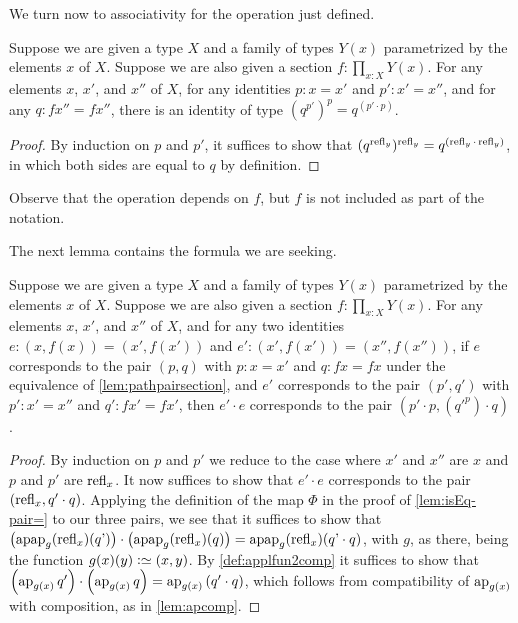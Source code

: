 We turn now to associativity for the operation just defined.

\begin{lemma}\label{def:pathsectionactionassoc}
  Suppose we are given a type $X$ and a family of types $Y(x)$ parametrized by the elements $x$ of $X$.
  Suppose we are also given a section $f : \prod_{x:X} Y(x)$.
  For any elements $x$, $x'$, and $x''$ of $X$, for any identities $p : x = x'$ and $p' : x' = x''$,
  and for any $q : f x'' = f x''$,
  there is an identity of type $ ( q ^{ p' }) ^ p = q ^{( p' \cdot p )}$.
\end{lemma}

\begin{proof}
  By induction on $p$ and $p'$, it suffices to show that $ ( q ^{ \refl y }) ^ { \refl y } = q ^{( \refl y \cdot \refl y )}$, in which both sides are
  equal to $q$ by definition.
\end{proof}

Observe that the operation depends on $f$, but $f$ is not included as part of the notation.

The next lemma contains the formula we are seeking.

\begin{lemma}\label{lem:pathpairsectionmult}
  Suppose we are given a type $X$ and a family of types $Y(x)$ parametrized by the elements $x$ of $X$.
  Suppose we are also given a section $f : \prod_{x:X} Y(x)$.
  For any elements $x$, $x'$, and $x''$ of $X$, and for any two identities $e : (x,f(x)) = (x',f(x'))$ and $e' : (x',f(x')) = (x'',f(x''))$,
  if $e$ corresponds to the pair $(p,q)$ with $p : x = x'$ and $q : f x = f x$ under the equivalence of \cref{lem:pathpairsection},
  and $e'$ corresponds to the pair $(p',q')$ with $p' : x' = x''$ and $q' : f x' = f x'$,
  then $e' \cdot e$ corresponds to the pair $(p' \cdot p , ({q'} ^ p) \cdot q)$.
\end{lemma}

\begin{proof}
  By induction on $p$ and $p'$ we reduce to the case where $x'$ and $x''$ are $x$ and $p$ and $p'$ are $\refl x$. 
  It now suffices to show that $e' \cdot e$ corresponds to the pair $(\refl x , q' \cdot q)$.
  Applying the definition of the map $\Phi$ in the proof of \cref{lem:isEq-pair=} to our three pairs, we see that it suffices to show that
  $\left( \apap g {\refl x} {q'} \right) \cdot \left( \apap g {\refl x} {q} \right) = \apap g {\refl x} {q' \cdot q}$, with $g$, as there, being the function $ g(x)(y) \defeq (x,y)$.
  By \cref{def:applfun2comp} it suffices to show that $\left( \ap {g(x)} {q'} \right) \cdot \left( \ap {g(x)} {q} \right) = \ap {g(x)} {(q' \cdot q)}$, which follows from
  compatibility of $\ap {g(x)}$ with composition, as in \cref{lem:apcomp}.
\end{proof}

